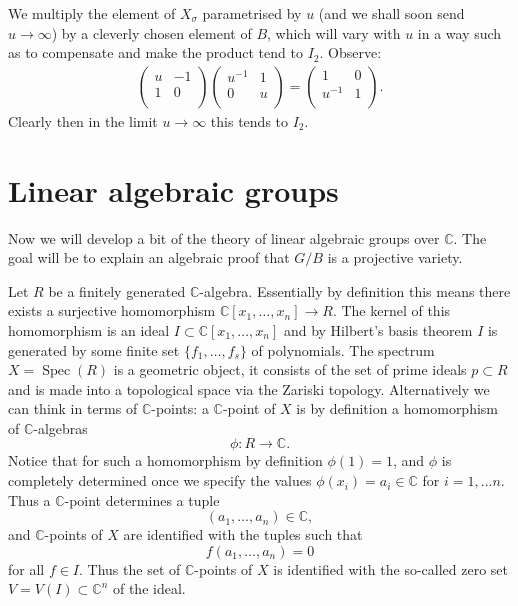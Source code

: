 \documentclass[12pt]{article}
\theoremstyle{plain}
\theoremstyle{definition}
\numberwithin{equation}{section}
\DeclareMathOperator{\spec}{Spec}
\newcommand{\C}{\mathbb{C}}
\begin{document}
We multiply the element of $X_\sigma$ parametrised by $u$ (and we shall soon send $u \rightarrow \infty$) by a cleverly chosen element of $B$, which will vary with $u$ in a way such as to compensate and make the product tend to $I_2$. Observe:
\begin{align*}
\left(
\begin{array}{cc}
u & -1 \\
1 & 0 \\
\end{array}
\right) \left(
\begin{array}{cc}
u^{-1} & 1 \\
0 & u \\
\end{array}
\right) = \left(
\begin{array}{cc}
1 & 0 \\
u^{-1} & 1 \\
\end{array}
\right).
\end{align*}
Clearly then in the limit $u \rightarrow \infty$ this tends to $I_2$.





\section{Linear algebraic groups}\label{sec:lin.alg.grp}

Now we will develop a bit of the theory of linear algebraic groups over $\C$. The goal will be to explain an algebraic proof that $G / B$ is a projective variety.


Let $R$ be a finitely generated $\C$-algebra. Essentially by definition this means there exists a surjective homomorphism $\C[x_1, \ldots, x_n] \rightarrow R$. The kernel of this homomorphism is an ideal $I \subset \C[x_1, \ldots, x_n]$ and by Hilbert's basis theorem $I$ is generated by some finite set $\{f_1, \ldots, f_s\}$ of polynomials. The spectrum $X = \spec(R)$ is a geometric object, it consists of the set of prime ideals $p \subset R$ and is made into a topological space via the Zariski topology. Alternatively we can think in terms of $\C$-points: a $\C$-point of $X$ is by definition a homomorphism of $\C$-algebras
\[
\phi: R \rightarrow \C.
\]
Notice that for such a homomorphism by definition $\phi(1) = 1$, and $\phi$ is completely determined once we specify the values $\phi(x_i) = a_i \in \C$ for $i=1, \ldots n$. Thus a $\C$-point determines a tuple
\[
(a_1, \ldots, a_n) \in \C,
\]
and $\C$-points of $X$ are identified with the tuples such that
\[
f(a_1, \ldots, a_n) = 0
\]
for all $f \in I$. Thus the set of $\C$-points of $X$ is identified with the so-called zero set $V = V(I) \subset \C^n$ of the ideal.
\end{document}
